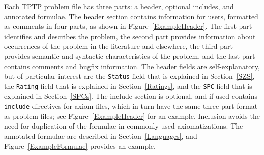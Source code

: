 \documentclass{easychair}
\begin{document}
Each TPTP problem file has three parts: a header, optional includes, and annotated formulae.
The header section contains information for users, formatted as comments in four parts, as shown
in Figure~\ref{ExampleHeader}.
The first part identifies and describes the problem,
the second part provides information about occurrences of the problem
in the literature and elsewhere,
the third part provides semantic and syntactic characteristics of the problem, and
the last part contains comments and bugfix information.
The header fields are self-explanatory, but of particular interest are the {\tt Status} field 
that is explained in Section~\ref{SZS}, the {\tt Rating} field that is explained in 
Section~\ref{Ratings}, and the {\tt SPC} field that is explained in Section~\ref{SPCs}.
The include section is optional, and if used contains {\tt include} directives for axiom files,
which in turn have the same three-part format as problem files; see Figure~\ref{ExampleHeader}
for an example.
Inclusion avoids the need for duplication of the formulae in commonly used axiomatizations.
The annotated formulae are described in Section~\ref{Languages}, and Figure~\ref{ExampleFormulae} 
provides an example.
\end{document}
